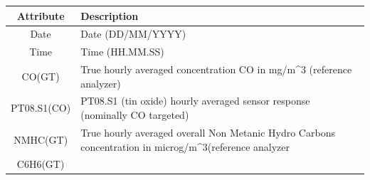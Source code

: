 \documentclass[]{article}
\begin{document}
\begin{longtable}[]{@{}cl@{}}
\toprule
\begin{minipage}[b]{0.15\columnwidth}\centering\strut
Attribute\strut
\end{minipage} & \begin{minipage}[b]{0.79\columnwidth}\raggedright\strut
Description\strut
\end{minipage}\tabularnewline
\midrule
\endhead
\begin{minipage}[t]{0.15\columnwidth}\centering\strut
Date\strut
\end{minipage} & \begin{minipage}[t]{0.79\columnwidth}\raggedright\strut
Date (DD/MM/YYYY)\strut
\end{minipage}\tabularnewline
\begin{minipage}[t]{0.15\columnwidth}\centering\strut
Time\strut
\end{minipage} & \begin{minipage}[t]{0.79\columnwidth}\raggedright\strut
Time (HH.MM.SS)\strut
\end{minipage}\tabularnewline
\begin{minipage}[t]{0.15\columnwidth}\centering\strut
CO(GT)\strut
\end{minipage} & \begin{minipage}[t]{0.79\columnwidth}\raggedright\strut
True hourly averaged concentration CO in mg/m\^{}3 (reference
analyzer)\strut
\end{minipage}\tabularnewline
\begin{minipage}[t]{0.15\columnwidth}\centering\strut
PT08.S1(CO)\strut
\end{minipage} & \begin{minipage}[t]{0.79\columnwidth}\raggedright\strut
PT08.S1 (tin oxide) hourly averaged sensor response (nominally CO
targeted)\strut
\end{minipage}\tabularnewline
\begin{minipage}[t]{0.15\columnwidth}\centering\strut
NMHC(GT)\strut
\end{minipage} & \begin{minipage}[t]{0.79\columnwidth}\raggedright\strut
True hourly averaged overall Non Metanic Hydro Carbons concentration in
microg/m\^{}3(reference analyzer\strut
\end{minipage}\tabularnewline
\begin{minipage}[t]{0.15\columnwidth}\centering\strut
C6H6(GT)\strut
\end{minipage} & \begin{minipage}[t]{0.79\columnwidth}\raggedright\strut

\end{minipage}
\end{longtable}
\end{document}
